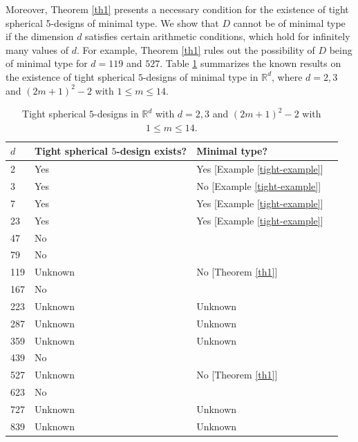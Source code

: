 \documentclass[11pt]{article}
\theoremstyle{definition}
\theoremstyle{remark}
\begin{document}
Moreover, Theorem \ref{th1} presents a necessary condition for the existence of tight spherical 5-designs of minimal type.
We show that $D$ cannot be of minimal type if the dimension $d$ satisfies certain arithmetic conditions, which hold for infinitely many values of $d$.
For example, Theorem \ref{th1} rules out the possibility of $D$ being of minimal type for $d=119$ and $527$.
Table \ref{table-tight spherical 5 design} summarizes the known results on the existence of tight spherical $5$-designs of minimal type in $\mathbb{R}^d$, where $d=2,3$ and $(2m+1)^2-2$ with $1\leq m\leq 14$.

\begin{table}[!h]
\caption{Tight spherical $5$-designs  in $\mathbb{R}^d$ with $d=2,3$ and $(2m+1)^2-2$ with $1\leq m\leq 14$.}
\centering
\label{table-tight spherical 5 design}
\begin{tabular}{llll}
 $d$  & Tight spherical $5$-design exists?   & Minimal type?    \\ \hline
    2    & Yes \cite{Mun06}     & Yes  [Example \ref{tight-example}]        \\ \hline
    3    & Yes \cite{Mun06}      & No  [Example \ref{tight-example}]       \\ \hline

 7    & Yes \cite{Mun06,CS88}     & Yes  [Example \ref{tight-example}]        \\ \hline
  23    & Yes \cite{Mun06}      & Yes  [Example \ref{tight-example}]       \\ \hline
 47            & No \cite{Mak02,BMV04,NV13}  \\ \hline
 79             & No \cite{BMV04,NV13}    \\ \hline
  119    & Unknown          & No [Theorem \ref{th1}]  \\ \hline
  167        & No \cite{NV13} \\ \hline
  223         & Unknown          & Unknown        \\ \hline
  287       & Unknown        & Unknown                  \\ \hline
  359        & Unknown        &Unknown            \\ \hline
 439        & No \cite{BMV04,NV13}     &    \\ \hline
  527        & Unknown       & No  [Theorem \ref{th1}]  \\ \hline
 623       & No \cite{NV13}        &             \\ \hline
  727       & Unknown    &  Unknown   \\ \hline
  839       & Unknown    & Unknown    \\ \hline
\end{tabular}
\end{table}
\end{document}
